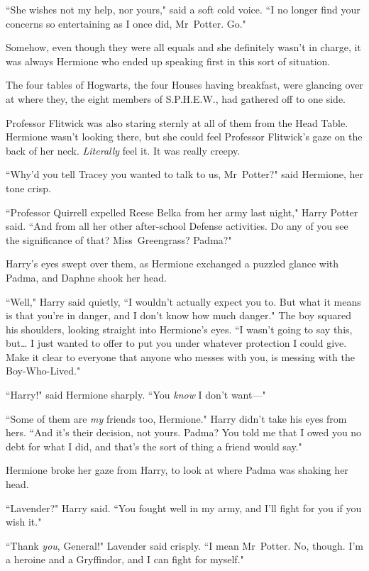 ``She wishes not my help, nor yours," said a soft cold voice. ``I no longer find your concerns so entertaining as I once did, Mr~Potter. Go."

\later

Somehow, even though they were all equals and she definitely wasn't in charge, it was always Hermione who ended up speaking first in this sort of situation.

The four tables of Hogwarts, the four Houses having breakfast, were glancing over at where they, the eight members of S.P.H.E.W., had gathered off to one side.

Professor Flitwick was also staring sternly at all of them from the Head Table. Hermione wasn't looking there, but she could feel Professor Flitwick's gaze on the back of her neck. \emph{Literally} feel it. It was really creepy.

``Why'd you tell Tracey you wanted to talk to us, Mr~Potter?" said Hermione, her tone crisp.

``Professor Quirrell expelled Reese Belka from her army last night," Harry Potter said. ``And from all her other after-school Defense activities. Do any of you see the significance of that? Miss~Greengrass? Padma?"

Harry's eyes swept over them, as Hermione exchanged a puzzled glance with Padma, and Daphne shook her head.

``Well," Harry said quietly, ``I wouldn't actually expect you to. But what it means is that you're in danger, and I don't know how much danger." The boy squared his shoulders, looking straight into Hermione's eyes. ``I wasn't going to say this, but{\ldots} I just wanted to offer to put you under whatever protection I could give. Make it clear to everyone that anyone who messes with you, is messing with the Boy-Who-Lived."

``Harry!" said Hermione sharply. ``You \emph{know} I don't want—"

``Some of them are \emph{my} friends too, Hermione." Harry didn't take his eyes from hers. ``And it's their decision, not yours. Padma? You told me that I owed you no debt for what I did, and that's the sort of thing a friend would say."

Hermione broke her gaze from Harry, to look at where Padma was shaking her head.

``Lavender?" Harry said. ``You fought well in my army, and I'll fight for you if you wish it."

``Thank \emph{you}, General!" Lavender said crisply. ``I mean Mr~Potter. No, though. I'm a heroine and a Gryffindor, and I can fight for myself."

